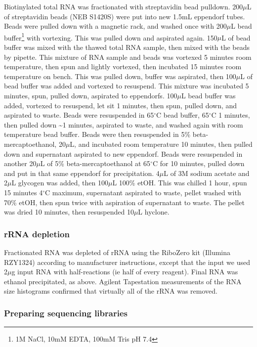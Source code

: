 {Biotinylated total RNA was fractionated with streptavidin bead pulldown.
200\(\mu\)L of streptavidin beads (NEB S1420S) were put into new 1.5mL
eppendorf tubes. Beads were pulled down with a magnetic rack, and washed
once with 200\(\mu\)L bead buffer\footnote{1M NaCl, 10mM EDTA, 100mM
  Tris pH 7.4} with vortexing. This was pulled down and aspirated again.
150\(\mu\)L of bead buffer was mixed with the thawed total RNA sample,
then mixed with the beads by pipette. This mixture of RNA sample and
beads was vortexed 5 minutes room temperature, then spun and lightly
vortexed, then incubated 15 minutes room temperature on bench. This was
pulled down, buffer was aspirated, then 100\(\mu\)L of bead buffer was
added and vortexed to resuspend. This mixture was incubated 5 minutes,
spun, pulled down, aspirated to eppendorfs. 100\(\mu\)L bead buffer was
added, vortexed to resuspend, let sit 1 minutes, then spun, pulled down,
and aspirated to waste. Beads were resuspended in 65\(^{\circ}\)C bead
buffer, 65\(^{\circ}\)C 1 minutes, then pulled down \textasciitilde{}1
minutes, aspirated to waste, and washed again with room temperature bead
buffer. Beads were then resuspended in 5\% beta-mercaptoethanol,
20\(\mu\)L, and incubated room temperature 10 minutes, then pulled down
and supernatant aspirated to new eppendorf. Beads were resuspended in
another 20\(\mu\)L of 5\% beta-mercaptoethanol at 65\(^{\circ}\)C for 10
minutes, pulled down and put in that same eppendorf for precipitation.
4\(\mu\)L of 3M sodium acetate and 2\(\mu\)L glycogen was added, then
100\(\mu\)L 100\% etOH. This was chilled 1 hour, spun 15 minutes
4\(^{\circ}\)C maximum, supernatant aspirated to waste, pellet washed
with 70\% etOH, then spun twice with aspiration of supernatant to waste.
The pellet was dried 10 minutes, then resuspended 10\(\mu\)L hyclone.

\subsubsection{rRNA depletion}

Fractionated RNA was depleted of rRNA using the RiboZero kit (Illumina
RZY1324) according to manufacturer instructions, except that the input
we used 2\(\mu\)g input RNA with half-reactions (ie half of every
reagent). Final RNA was ethanol precipitated, as above. Agilent
Tapestation measurements of the RNA size histograms confirmed that
virtually all of the rRNA was removed.

\subsubsection{Preparing sequencing libraries}

}
